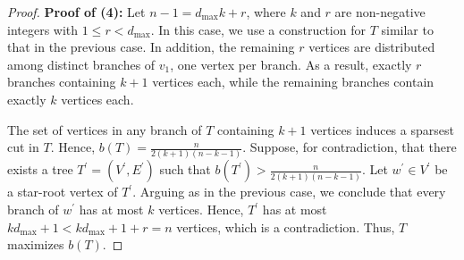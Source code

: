 \documentclass[10pt,a4paper]{amsart}
\begin{document}
\begin{proof}
\noindent\textbf{Proof of (4):} Let $n-1=d_{\max}k+r$, where $k$ and $r$ are non-negative integers with $1 \leq r <d_{\max}$.
In this case, we use a construction for $T$ similar to that in the previous case. In addition, the remaining $r$ vertices are distributed among distinct branches of $v_1$, one vertex per branch. As a result, exactly $r$ branches containing $k+1$ vertices each, while the remaining branches contain exactly $k$ vertices each.




 The set of vertices in any branch of $T$ containing $k+1$ vertices induces a sparsest cut in $T$.  Hence, $b(T)=\frac{n}{2(k+1)(n-k-1)}$. Suppose, for contradiction, that there exists a tree $T^\prime=(V^\prime,E^\prime)$ such that $b(T^\prime) >\frac{n}{2(k+1)(n-k-1)}$. Let $w^\prime \in V^\prime$ be a star-root vertex of $T^\prime.$ Arguing as in the previous case, we conclude that every branch of $w^\prime$ has at most $k$ vertices. Hence, $T^\prime$ has at most $kd_{\max}+1<kd_{\max}+1+r=n$ vertices, which is a contradiction. Thus, $T$ maximizes $b(T)$.
\end{proof}
\end{document}
